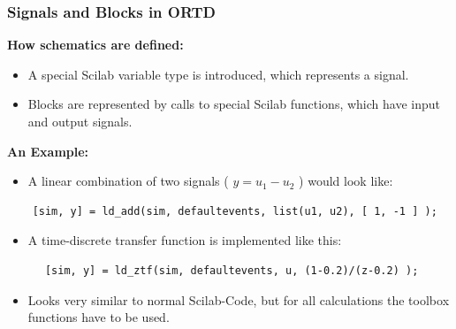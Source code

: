\documentclass[serif,9pt,xcolor=dvipsnames]{beamer}
\begin{document}
\begin{frame}[fragile]
    \frametitle{Signals and Blocks in ORTD}

\textbf{How schematics are defined:}

  \begin{itemize}
  \item A special Scilab variable type is introduced, which represents a signal.
  \item Blocks are represented by calls to special Scilab functions, which have input and output signals.
  \end{itemize}

\textbf{An Example:}
  \begin{itemize}
  \item A linear combination of two signals ( $y=u_1 - u_2$ ) would look like:
  \end{itemize}

  {\small 
  \begin{lstlisting}
    [sim, y] = ld_add(sim, defaultevents, list(u1, u2), [ 1, -1 ] );
  \end{lstlisting}}
    

  \begin{itemize}
  \item A time-discrete transfer function is implemented like this:
  \end{itemize}

  {\small 
  \begin{lstlisting} 
      [sim, y] = ld_ztf(sim, defaultevents, u, (1-0.2)/(z-0.2) );
  \end{lstlisting}}


  \begin{itemize}
  \item Looks very similar to normal Scilab-Code, but for all calculations the toolbox functions have to be used.
  \end{itemize}
  


\end{frame}
\end{document}
